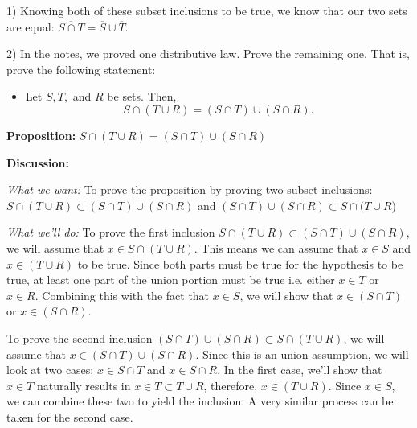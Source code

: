 \begin{paragraph}{1)}
    Knowing both of these subset inclusions to be true, we know that our
    two sets are equal: $\overline{S \cap T} = \overline{S} \cup \overline{T}$.

    \proofEnd

    \end{paragraph}

    \bigskip

    \begin{paragraph}{2)}
        In the notes, we proved one distributive law.  Prove the remaining one.  That is, prove the following statement:

        \begin{itemize}

        \item[] Let $S, T,$ and $R$ be sets.  Then, $$S \cap (T \cup R) = (S \cap T) \cup (S \cap R).$$

        \end{itemize}

        \separate\spacing

        \textbf{Proposition:} $S \cap (T \cup R) = (S \cap T) \cup (S \cap R)$
        \spacing

        \textbf{Discussion:} 

        \textit{What we want:} To prove the proposition by proving
        two subset inclusions:
        $S \cap (T \cup R) \subset (S \cap T) \cup (S \cap R)$ and
        $(S \cap T) \cup (S \cap R) \subset S \cap (T \cup R$)
        \spacing

        \textit{What we'll do:} To prove the first inclusion $S \cap (T \cup R) \subset (S \cap T) \cup (S \cap R)$,
        we will assume that $x \in S \cap (T \cup R)$. This means we 
        can assume that $x \in S$ and $x \in (T \cup R)$ to be true.
        Since both parts must be true for the hypothesis to be true,
        at least one part of the union portion must be true i.e. either
        $x \in T$ or $x \in R$. Combining this with the fact that $x \in S$,
        we will show that $x \in (S \cap T)$ or $x \in (S \cap R)$.

        To prove the second inclusion $(S \cap T) \cup (S \cap R) \subset S \cap (T \cup R)$,
        we will assume that $x \in (S \cap T) \cup (S \cap R)$. Since this
        is an union assumption, we will look at two cases: 
        $x \in S \cap T$ and $x \in S \cap R$. In the first case, we'll show that 
        $x \in T$ naturally results in $x \in T \subset T \cup R$, therefore,
        $x \in (T \cup R)$. Since $x \in S$, we can combine these two to yield the 
        inclusion. A very similar process can be taken for the second case.     
        \spacing


\end{paragraph}
